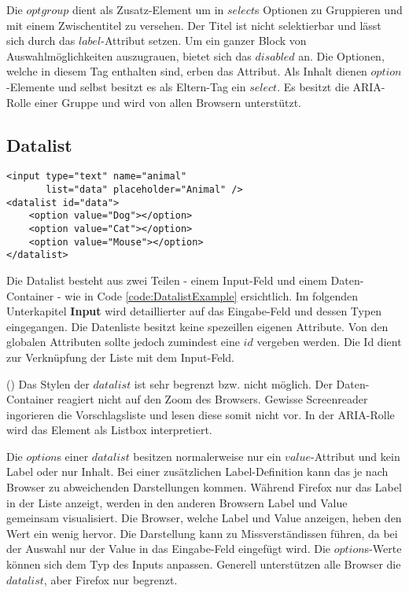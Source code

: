 Die $optgroup$ dient als Zusatz-Element um in $select$s Optionen zu Gruppieren und mit einem Zwischentitel zu versehen.
Der Titel ist nicht selektierbar und lässt sich durch das $label$-Attribut setzen. 
Um ein ganzer Block von Auswahlmöglichkeiten auszugrauen, bietet sich das $disabled$ an.
Die Optionen, welche in diesem Tag enthalten sind, erben das Attribut.
Als Inhalt dienen $option$-Elemente und selbst besitzt es als Eltern-Tag ein $select$.
Es besitzt die ARIA-Rolle einer Gruppe und wird von allen Browsern unterstützt.


\subsection{Datalist}

\begin{lstlisting}[language = html5, caption = Datalist Example, label = code:DatalistExample]
<input type="text" name="animal" 
       list="data" placeholder="Animal" />
<datalist id="data">
    <option value="Dog"></option>
    <option value="Cat"></option>
    <option value="Mouse"></option>
</datalist>
\end{lstlisting}

Die Datalist besteht aus zwei Teilen - einem Input-Feld und einem Daten-Container - wie in Code \ref{code:DatalistExample} ersichtlich. 
Im folgenden Unterkapitel \textbf{Input} wird detaillierter auf das Eingabe-Feld und dessen Typen eingegangen.
Die Datenliste besitzt keine spezeillen eigenen Attribute.
Von den globalen Attributen sollte jedoch zumindest eine $id$ vergeben werden.
Die Id dient zur Verknüpfung der Liste mit dem Input-Feld. 

(\cite{datalistMdn}) Das Stylen der $datalist$ ist sehr begrenzt bzw. nicht möglich. 
Der Daten-Container reagiert nicht auf den Zoom des Browsers.
Gewisse Screenreader ingorieren die Vorschlagsliste und lesen diese somit nicht vor.
In der ARIA-Rolle wird das Element als Listbox interpretiert.

Die $option$s einer $datalist$ besitzen normalerweise nur ein $value$-Attribut und kein Label oder nur Inhalt.
Bei einer zusätzlichen Label-Definition kann das je nach Browser zu abweichenden Darstellungen kommen. 
Während Firefox nur das Label in der Liste anzeigt, werden in den anderen Browsern Label und Value gemeinsam visualisiert. 
Die Browser, welche Label und Value anzeigen, heben den Wert ein wenig hervor.
Die Darstellung kann zu Missverständissen führen, da bei der Auswahl nur der Value in das Eingabe-Feld eingefügt wird. 
Die $option$s-Werte können sich dem Typ des Inputs anpassen. 
Generell unterstützen alle Browser die $datalist$, aber Firefox nur begrenzt.

